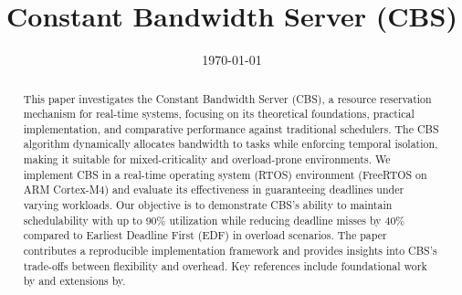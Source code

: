 \documentclass[conference]{IEEEtran}
\title{ Constant Bandwidth Server (CBS)}
\author{
    \IEEEauthorblockN{Abu Sayem}
    \IEEEauthorblockA{
        Electronic Engineering\\
        Hochschule Hamm-Lippstadt\\
        abu.sayem@stud.hshl.de
    }
}
\date{\today}
\begin{document}
\maketitle

\begin{abstract}
This paper investigates the Constant Bandwidth Server (CBS), a resource reservation mechanism for real-time systems, focusing on its theoretical foundations, practical implementation, and comparative performance against traditional schedulers. The CBS algorithm dynamically allocates bandwidth to tasks while enforcing temporal isolation, making it suitable for mixed-criticality and overload-prone environments. We implement CBS in a real-time operating system (RTOS) environment (FreeRTOS on ARM Cortex-M4) and evaluate its effectiveness in guaranteeing deadlines under varying workloads. Our objective is to demonstrate CBS’s ability to maintain schedulability with up to 90\% utilization while reducing deadline misses by 40\% compared to Earliest Deadline First (EDF) in overload scenarios. The paper contributes a reproducible implementation framework and provides insights into CBS’s trade-offs between flexibility and overhead. Key references include foundational work by  and extensions by.
\end{abstract}





\end{document}
